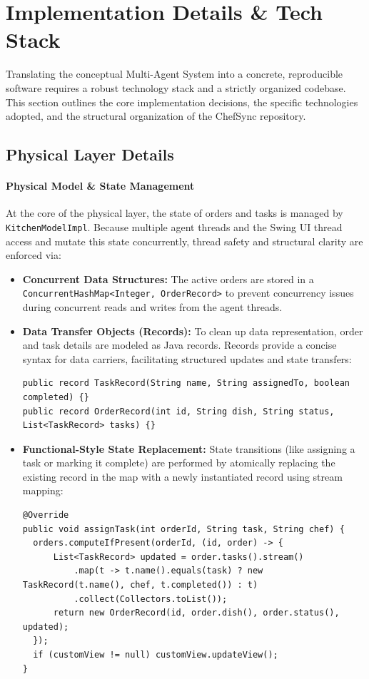 \documentclass{scrartcl}
\begin{document}
\newpage
\section{Implementation Details \& Tech Stack}

Translating the conceptual Multi-Agent System into a concrete, reproducible software requires a robust technology stack and a strictly organized codebase. This section outlines the core implementation decisions, the specific technologies adopted, and the structural organization of the ChefSync repository.

\subsection{Physical Layer Details}

\paragraph{Physical Model \& State Management}
At the core of the physical layer, the state of orders and tasks is managed by \texttt{KitchenModelImpl}. Because multiple agent threads and the Swing UI thread access and mutate this state concurrently, thread safety and structural clarity are enforced via:

\begin{itemize}
\item \textbf{Concurrent Data Structures:} The active orders are stored in a \texttt{ConcurrentHashMap<Integer, OrderRecord>} to prevent concurrency issues during concurrent reads and writes from the agent threads.

\item \textbf{Data Transfer Objects (Records):} To clean up data representation, order and task details are modeled as Java records. Records provide a concise syntax for data carriers, facilitating structured updates and state transfers:
\begin{lstlisting}[basicstyle=\footnotesize\ttfamily, breaklines=true]
public record TaskRecord(String name, String assignedTo, boolean completed) {}
public record OrderRecord(int id, String dish, String status, List<TaskRecord> tasks) {}
\end{lstlisting}

\item \textbf{Functional-Style State Replacement:} State transitions (like assigning a task or marking it complete) are performed by atomically replacing the existing record in the map with a newly instantiated record using stream mapping:
\begin{lstlisting}[basicstyle=\footnotesize\ttfamily, breaklines=true]
@Override
public void assignTask(int orderId, String task, String chef) {
  orders.computeIfPresent(orderId, (id, order) -> {
      List<TaskRecord> updated = order.tasks().stream()
          .map(t -> t.name().equals(task) ? new TaskRecord(t.name(), chef, t.completed()) : t)
          .collect(Collectors.toList());
      return new OrderRecord(id, order.dish(), order.status(), updated);
  });
  if (customView != null) customView.updateView();
}
\end{lstlisting}
\end{itemize}
\end{document}
